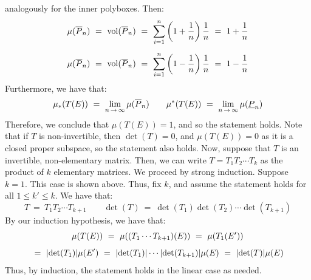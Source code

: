 \begin{pf}[title=Linear case]
    analogously for the inner polyboxes. Then:
    \begin{gather*}
        \mu(\bar{P}_{n}) \ = \ \vol(\bar{P}_{n}) \ = \ \sum_{i=1}^{n}\left(
        1+\frac{1}{n} \right)\frac{1}{n} \ = \ 1 + \frac{1}{n} \vsp
        \mu(\bar{P}_{n}) \ = \ \vol(\bar{P}_{n}) \ = \ \sum_{i=1}^{n}\left(
        1-\frac{1}{n} \right)\frac{1}{n} \ = \ 1 - \frac{1}{n}
    \end{gather*}
    Furthermore, we have that:
    \begin{equation*}
        \mu_{*}(T(E)) \ = \ \lim_{n\sto\infty}\mu(\bar{P}_{n}) \qquad
        \mu^{*}(T(E)) \ = \ \lim_{n\sto\infty}\mu(\underline{P}_{n})
    \end{equation*}
    Therefore, we conclude that $ \mu(T(E)) = 1 $, and so the statement holds.
    \vsp
    Note that if $ T $ is non-invertible, then $ \det(T) = 0 $, and
    $ \mu(T(E)) = 0 $ as it is a closed proper subspace, so the statement also
    holds. Now, suppose that $ T $ is an invertible, non-elementary matrix. Then,
    we can write $ T = T_{1}T_{2}\cdots T_{k} $ as the product of $ k $
    elementary matrices. We proceed by strong induction. \vsp
    Suppose $ k=1 $. This case is shown above. Thus, fix $ k $, and assume the
    statement holds for all $ 1 \leq k' \leq k $. We have that:
    \begin{equation*}
        T \ = \ T_{1}T_{2}\cdots T_{k+1} \qquad
        \det(T) \ = \ \det(T_{1})\det(T_{2})\cdots \det(T_{k+1})
    \end{equation*}
    By our induction hypothesis, we have that:
    \begin{gather*}
        \mu(T(E)) \ = \ \mu((T_{1}\cdots T_{k+1})(E)) \ = \ \mu(T_{1}(E')) \vsp
        \ = \ \abs{\det(T_{1})}\mu(E') \ = \ \abs{\det(T_{1})}\cdots
        \abs{\det(T_{k+1})}\mu(E) \ = \ \abs{\det(T)}\mu(E)
    \end{gather*}
    Thus, by induction, the statement holds in the linear case as needed.
\end{pf}

